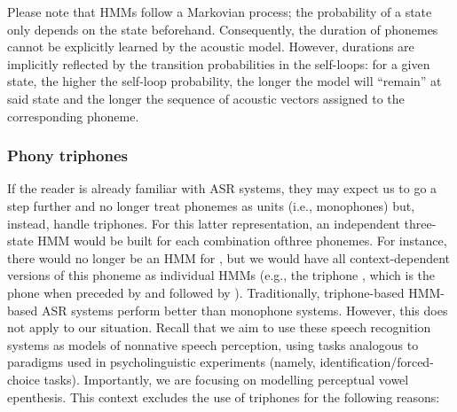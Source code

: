 Please note that HMMs follow a Markovian process; the probability of a state only depends on the state beforehand. Consequently, the duration of phonemes cannot be explicitly learned by the acoustic model. However, durations are implicitly reflected by the transition probabilities in the self-loops: for a given state, the higher the self-loop probability, the longer the model will ``remain'' at said state and the longer the sequence of acoustic vectors assigned to the corresponding phoneme.     

\subsubsection{Phony triphones}
If the reader is already familiar with ASR systems, they may expect us to go a step further and no longer treat phonemes as units (i.e., monophones) but, instead, handle triphones. For this latter representation, an independent three-state HMM would be built for each combination ofthree phonemes. For instance, there would no longer be an HMM for , but we would have all context-dependent versions of this phoneme as individual HMMs (e.g., the triphone , which is the phone  when preceded by  and followed by ).
Traditionally, triphone-based HMM-based ASR systems perform better than monophone systems. However, this does not apply to our situation. Recall that we aim to use these speech recognition systems as models of nonnative speech perception, using tasks analogous to paradigms used in psycholinguistic experiments (namely, identification/forced-choice tasks). Importantly, we are focusing on modelling perceptual vowel epenthesis. This context excludes the use of triphones for the following reasons:
